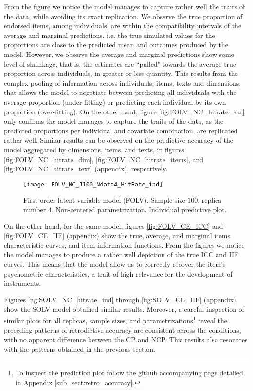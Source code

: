 From the figure we notice the model manages to capture rather well the traits of the data, while avoiding its exact replication. We observe the true proportion of endorsed items, among individuals, are within the compatibility intervals of the average and marginal predictions, i.e. the true simulated values for the proportions are close to the predicted mean and outcomes produced by the model. However, we observe the average and marginal predictions show some level of shrinkage, that is, the estimates are ``pulled" towards the average true proportion across individuals, in greater or less quantity. This results from the complex pooling of information across individuals, items, texts and dimensions; that allows the model to negotiate between predicting all individuals with the average proportion (under-fitting) or predicting each individual by its own proportion (over-fitting). On the other hand, figure \ref{fig:FOLV_NC_hitrate_var} only confirms the model manages to capture the traits of the data, as the predicted proportions per individual and covariate combination, are replicated rather well. Similar results can be observed on the predictive accuracy of the model aggregated by dimensions, items, and texts, in figures \ref{fig:FOLV_NC_hitrate_dim}, \ref{fig:FOLV_NC_hitrate_items}, and \ref{fig:FOLV_NC_hitrate_text} (appendix), respectively.
%
\begin{figure}[H]
	\centering
	\texttt{[image: FOLV\_NC\_J100\_Ndata4\_HitRate\_ind]}
	\caption[First-order latent variable model (FOLV). Sample size $100$, replica number $4$. Non-centered parametrization. Individual predictive plot.]%
	{First-order latent variable model (FOLV). Sample size $100$, replica number $4$. Non-centered parametrization. Individual predictive plot.}
	\label{fig:FOLV_NC_hitrate_ind}
\end{figure}

On the other hand, for the same model, figures \ref{fig:FOLV_CE_ICC} and \ref{fig:FOLV_CE_IIF} (appendix) show the true, average, and marginal items characteristic curves, and item information functions. From the figures we notice the model manages to produce a rather well depiction of the true ICC and IIF curves. This means that the model allow us to correctly recover the item's psychometric characteristics, a trait of high relevance for the development of instruments.

Figures \ref{fig:SOLV_NC_hitrate_ind} through \ref{fig:SOLV_CE_IIF} (appendix) show the SOLV model obtained similar results. Moreover, a careful inspection of similar plots for all replicas, sample sizes, and parametrizations\footnote{To inspect the prediction plot follow the github accompanying page detailed in Appendix \ref{sub_sect:retro_accuracy}.} reveal the preceding patterns of retrodictive accuracy are consistent across the conditions, with no apparent difference between the CP and NCP. This results also resonates with the patterns obtained in the previous section.


